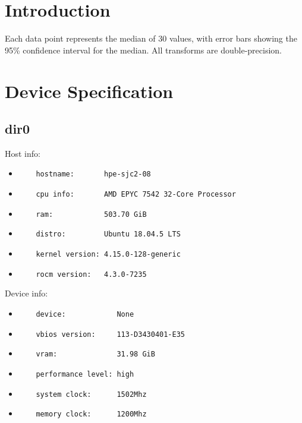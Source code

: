 \documentclass[12pt]{article}
\begin{document}
\section{Introduction}
Each data point represents the median of 30 values, with error bars showing the 95\% confidence interval for the median.  All transforms are double-precision.

\vspace{1cm}

\section{Device Specification}

\subsection{dir0}
\noindent Host info:\begin{itemize}
\item \verb|    hostname:       hpe-sjc2-08|
\item \verb|    cpu info:       AMD EPYC 7542 32-Core Processor|
\item \verb|    ram:            503.70 GiB|
\item \verb|    distro:         Ubuntu 18.04.5 LTS|
\item \verb|    kernel version: 4.15.0-128-generic|
\item \verb|    rocm version:   4.3.0-7235|
\end{itemize}
Device info:\begin{itemize}
\item \verb|    device:            None|
\item \verb|    vbios version:     113-D3430401-E35|
\item \verb|    vram:              31.98 GiB|
\item \verb|    performance level: high|
\item \verb|    system clock:      1502Mhz|
\item \verb|    memory clock:      1200Mhz|
\end{itemize}
\end{document}
